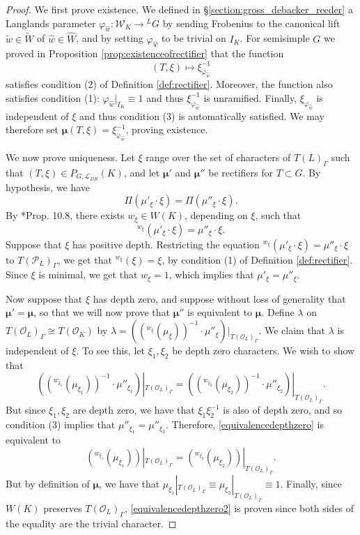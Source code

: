 \documentclass{mrlart7}
\theoremstyle{plain}
\theoremstyle{definition}
\numberwithin{equation}{section}
\newcommand{\OK}{\mathcal{O}_K}
\newcommand{\PL}{\mathcal{P}_L}
\newcommand{\OL}{\mathcal{O}_L}
\newcommand{\Weil}{\mathcal{W}}
\newcommand{\Lpack}{\mathcal{L}}
\newcommand{\bmu}{\boldsymbol\mu}
\begin{document}
\begin{proof}
We first prove existence.  We defined in
\S\ref{section:gross_debacker_reeder}
a Langlands parameter $\varphi_{\hat{w}} :\Weil _K \rightarrow {}^L G$ by
sending Frobenius to the canonical lift
$\tilde{w} \in \widetilde{W}$ of $\hat{w} \in \hat{W}$, and by setting
$\varphi_{\hat{w}}$ to be trivial on $I_K$.
For semisimple $G$
we proved in Proposition \ref{prop:existenceofrectifier}
that the function $$(T, \xi) \mapsto \xi_{\varphi_{\hat{w}}}^{-1}$$
satisfies condition (2) of Definition \ref{def:rectifier}.  Moreover, the function also
satisfies condition (1): $\varphi_{\hat{w}}|_{I_K} \equiv 1$ and thus
$\xi_{\varphi_{\hat{w}}}^{-1}$ is unramified.
Finally, $\xi_{\varphi_{\hat{w}}}$ is independent of $\xi$
and thus condition (3) is automatically satisfied.
We may therefore set
$\bmu(T,\xi) = \xi_{\varphi_{\hat{w}}}^{-1}$, proving existence.

We now prove uniqueness.
Let $\xi$ range over the set of characters of $T(L)_{\Gamma}$
such that $(T, \xi) \in P_{G, \Lpack_{DR}}(K)$, and let
$\bmu'$ and $\bmu''$ be rectifiers for
$T \subset G$.  By hypothesis, we have
$$\Pi(\mu'_{\xi} \cdot \xi) = \Pi(\mu''_{\xi} \cdot \xi).$$
By \cite{murnaghan:11}*{Prop. 10.8}, there exists $w_{\xi} \in W(K)$,
depending on $\xi$, such that
$${}^{w_{\xi}} (\mu'_\xi \cdot \xi) = \mu''_\xi \cdot \xi.$$
Suppose that $\xi$ has positive depth.
Restricting the equation
${}^{w_\xi} (\mu'_\xi \cdot \xi) = \mu''_\xi \cdot \xi$
to $T(\PL)_{\Gamma}$, we get that ${}^{w_{\xi}} (\xi) = \xi$,
by condition (1) of Definition \ref{def:rectifier}.
Since $\xi$ is minimal, we get that $w_{\xi} = 1$, which implies
that $\mu'_{\xi} = \mu''_{\xi}$.

Now suppose that $\xi$ has depth zero, and suppose without loss of generality that $\bmu' = \bmu$,
so that we will now prove that $\bmu''$ is equivalent to $\bmu$.  Define $\lambda$ on
$T(\OL)_{\Gamma} \cong T(\OK)$ by $\lambda = (({}^{w_\xi} (\mu_\xi))^{-1} \cdot \mu''_\xi)|_{T(\OL)_{\Gamma}}$.
We claim that $\lambda$ is independent of $\xi$.  To see this, let $\xi_1, \xi_2$ be depth zero characters.  We wish to show that
\begin{equation}\label{equivalencedepthzero}
(({}^{w_{\xi_1}} (\mu_{\xi_1}))^{-1} \cdot \mu''_{\xi_1})|_{T(\OL)_{\Gamma}} =
(({}^{w_{\xi_2}} (\mu_{\xi_2}))^{-1} \cdot \mu''_{\xi_2})|_{T(\OL)_{\Gamma}}.
\end{equation}
But since $\xi_1, \xi_2$ are depth zero, we have that $\xi_1 \xi_2^{-1}$ is also of depth zero,
and so condition (3) implies that $\mu''_{\xi_1} = \mu''_{\xi_2}$. Therefore, \eqref{equivalencedepthzero} is equivalent to
\begin{equation}\label{equivalencedepthzero2}
({}^{w_{\xi_1}} (\mu_{\xi_1}))|_{T(\OL)_{\Gamma}} = ({}^{w_{\xi_2}} (\mu_{\xi_2}))|_{T(\OL)_{\Gamma}}.
\end{equation}
But by definition of $\bmu$, we have that $\mu_{\xi_1}|_{T(\OL)_{\Gamma}} \equiv \mu_{\xi_2}|_{T(\OL)_{\Gamma}} \equiv 1$.
Finally, since $W(K)$ preserves $T(\OL)_{\Gamma}$, \eqref{equivalencedepthzero2}
is proven since both sides of the equality are the trivial character.


\end{proof}
\end{document}

